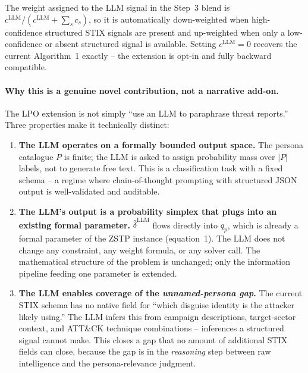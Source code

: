 \documentclass[10pt,twocolumn]{article}
\begin{document}
The weight assigned to the LLM signal in the Step~3 blend is $c^{\mathrm{LLM}}/(c^{\mathrm{LLM}} + \sum_{s} c_s)$, so it is automatically down-weighted when high-confidence structured STIX signals are present and up-weighted when only a low-confidence or absent structured signal is available. Setting $c^{\mathrm{LLM}}=0$ recovers the current Algorithm~1 exactly -- the extension is opt-in and fully backward compatible.

\paragraph{Why this is a genuine novel contribution, not a narrative add-on.}
The LPO extension is not simply ``use an LLM to paraphrase threat reports.'' Three properties make it technically distinct:

\begin{enumerate}[leftmargin=1.1em,itemsep=2pt]
\item \textbf{The LLM operates on a formally bounded output space.} The persona catalogue $P$ is finite; the LLM is asked to assign probability mass over $|P|$ labels, not to generate free text. This is a classification task with a fixed schema -- a regime where chain-of-thought prompting with structured JSON output is well-validated and auditable.
\item \textbf{The LLM's output is a probability simplex that plugs into an existing formal parameter.} $\hat{\delta}^{\mathrm{LLM}}$ flows directly into $q_p$, which is already a formal parameter of the ZSTP instance (equation~1). The LLM does not change any constraint, any weight formula, or any solver call. The mathematical structure of the problem is unchanged; only the information pipeline feeding one parameter is extended.
\item \textbf{The LLM enables coverage of the \emph{unnamed-persona gap}.} The current STIX schema has no native field for ``which disguise identity is the attacker likely using.'' The LLM infers this from campaign descriptions, target-sector context, and ATT\&CK technique combinations -- inferences a structured signal cannot make. This closes a gap that no amount of additional STIX fields can close, because the gap is in the \emph{reasoning} step between raw intelligence and the persona-relevance judgment.
\end{enumerate}
\end{document}

